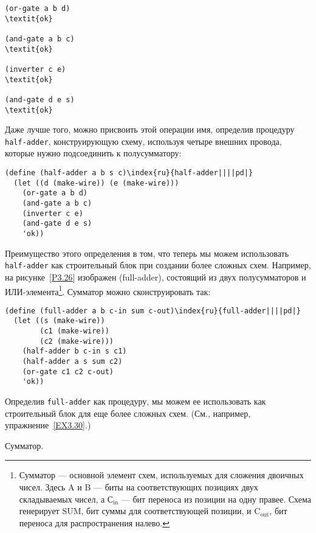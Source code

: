 \begin{Verbatim}[fontsize=\small]
(or-gate a b d)
\textit{ok}

(and-gate a b c)
\textit{ok}

(inverter c e)
\textit{ok}

(and-gate d e s)
\textit{ok}
\end{Verbatim}

Даже лучше того, можно присвоить этой операции имя,
определив процедуру {\tt half-adder},
конструирующую схему, используя четыре внешних провода, которые нужно
подсоединить к полусумматору:

\begin{Verbatim}[fontsize=\small]
(define (half-adder a b s c)\index{ru}{half-adder||||pd|}
  (let ((d (make-wire)) (e (make-wire)))
    (or-gate a b d)
    (and-gate a b c)
    (inverter c e)
    (and-gate d e s)
    'ok))
\end{Verbatim}
Преимущество этого определения в том, что теперь мы можем использовать
{\tt half-adder} как строительный блок при создании более
сложных схем.  Например, на
рисунке~\ref{P3.26} изображен
 (full-adder), состоящий из двух
полусумматоров и ИЛИ-элемента\footnote{Сумматор --- основной элемент схем, используемых
для сложения двоичных чисел.  Здесь A и B --- биты на соответствующих
позициях двух складываемых чисел, а С${}_{\mbox{in}}$ --- бит
переноса из позиции на одну правее.  Схема генерирует SUM, бит суммы
для соответствующей позиции, и C${}_{\mbox{out}}$, бит
переноса для распространения налево.
}.
Сумматор можно сконструировать так:

\begin{Verbatim}[fontsize=\small]
(define (full-adder a b c-in sum c-out)\index{ru}{full-adder||||pd|}
  (let ((s (make-wire))
        (c1 (make-wire))
        (c2 (make-wire)))
    (half-adder b c-in s c1)
    (half-adder a s sum c2)
    (or-gate c1 c2 c-out)
    'ok))
\end{Verbatim}
Определив {\tt full-adder} как процедуру, мы можем ее
использовать как строительный блок для еще более сложных
схем. (См., например, упражнение~\ref{EX3.30}.)


\begin{cntrfig}

\caption{Сумматор.}
\label{P3.26}

\end{cntrfig}


